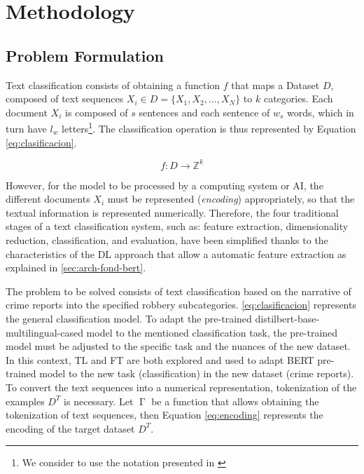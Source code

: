 \documentclass[onecolumn, journal, english, 12pt, a4paper]{IEEEtran} %
\DeclareMathOperator{\Tokenization}{\Gamma}
\theoremstyle{definition}
\begin{document}
\section{Methodology}\label{chap:metodos}
\subsection{Problem Formulation}

Text classification consists of obtaining a function $f$ that maps a
Dataset $D$, composed of text sequences
$X_i \in D=\{X_1, X_2, \dots, X_N\}$ to $k$ categories. Each document
$X_i$ is composed of $s$ sentences and each sentence of $w_s$ words,
which in turn have $l_w$ letters\footnote{We consider to use the
  notation presented in \cite{Kowsari2019}}. The classification
operation is thus represented by Equation \eqref{eq:clasificacion}.

\begin{equation}\label{eq:clasificacion}
    f: D \longrightarrow \mathbb{Z}^k
\end{equation}

However, for the model to be processed by a computing system or AI,
the different documents $X_i$ must be represented (\emph{encoding})
appropriately, so that the textual information is represented
numerically. Therefore, the four traditional stages of a text
classification system, such as: feature extraction, dimensionality
reduction, classification, and evaluation, have been simplified thanks
to the characteristics of the DL approach that allow a automatic
feature extraction as explained in \ref{sec:arch-fond-bert}.



The problem to be solved consists of text classification based on the
narrative of crime reports into the specified robbery
subcategories. \eqref{eq:clasificacion} represents the general
classification model. To adapt the pre-trained
distilbert-base-multilingual-cased model to the mentioned
classification task, the pre-trained model must be adjusted to the
specific task and the nuances of the new dataset. In this context, TL
and FT are both explored and used to adapt BERT pre-trained model to
the new task (classification) in the new dataset (crime reports). To
convert the text sequences into a numerical representation,
tokenization of the examples $D^T$ is necessary. Let $\Tokenization$
be a function that allows obtaining the tokenization of text
sequences, then Equation \ref{eq:encoding} represents the encoding of
the target dataset $D^T$.
\end{document}
